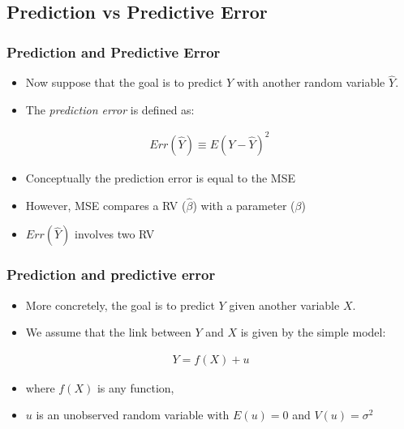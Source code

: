 \documentclass[
  shownotes,
  xcolor={svgnames},
  hyperref={colorlinks,citecolor=DarkBlue,linkcolor=DarkRed,urlcolor=DarkBlue}
  ]{beamer}
\begin{document}
\subsection{Prediction vs Predictive Error}
\begin{frame}
\frametitle{Prediction and Predictive Error}

\begin{itemize}
  \item Now suppose that the goal is to predict $Y$ with another random variable $\hat Y$.
  \bigskip
  \item The \emph{prediction error} is defined as:
\end{itemize}
  \bigskip

  \begin{align}
    Err(\hat Y) \equiv E\left(Y-\hat Y\right)^2\
  \end{align}

\begin{itemize}
  \item Conceptually the prediction error is equal to the MSE
  \bigskip
  \item However, MSE compares a RV ($\hat \beta$) with a parameter ($\beta$)
  \bigskip
  \item $Err(\hat Y)$ involves two RV 
\end{itemize}



\end{frame}

\begin{frame}
\frametitle{Prediction and predictive error}

\begin{itemize}
  \item More concretely, the goal is to predict $Y$ given another variable $X$. 
  \bigskip
  \item We  assume that the link between $Y$ and $X$ is given by the simple model:
\end{itemize}
\bigskip
\begin{align}
  Y = f(X) + u
\end{align}
\bigskip
\begin{itemize}
  \item where $f(X)$ is any function, 
  \bigskip
  \item  $u$ is an unobserved random variable with $E(u)=0$ and $V(u) = \sigma^2$
\end{itemize}


\end{frame}
\end{document}
